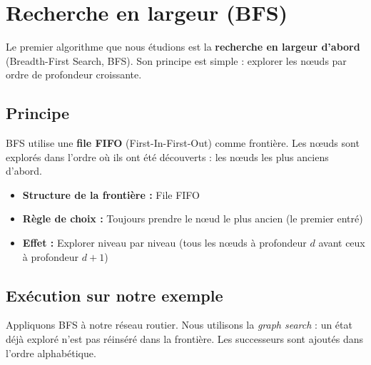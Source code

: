 \documentclass[11pt,a4paper]{article}
\begin{document}
\section{Recherche en largeur (BFS)}

Le premier algorithme que nous étudions est la \textbf{recherche en largeur d'abord} (Breadth-First Search, BFS). Son principe est simple : explorer les nœuds par ordre de profondeur croissante.

\subsection{Principe}

BFS utilise une \textbf{file FIFO} (First-In-First-Out) comme frontière. Les nœuds sont explorés dans l'ordre où ils ont été découverts : les nœuds les plus anciens d'abord.

\begin{recipebox}
\begin{itemize}
    \item \textbf{Structure de la frontière :} File FIFO
    \item \textbf{Règle de choix :} Toujours prendre le nœud le plus ancien (le premier entré)
    \item \textbf{Effet :} Explorer niveau par niveau (tous les nœuds à profondeur $d$ avant ceux à profondeur $d+1$)
\end{itemize}
\end{recipebox}

\subsection{Exécution sur notre exemple}

Appliquons BFS à notre réseau routier. Nous utilisons la \textit{graph search} : un état déjà exploré n'est pas réinséré dans la frontière. Les successeurs sont ajoutés dans l'ordre alphabétique.
\end{document}
